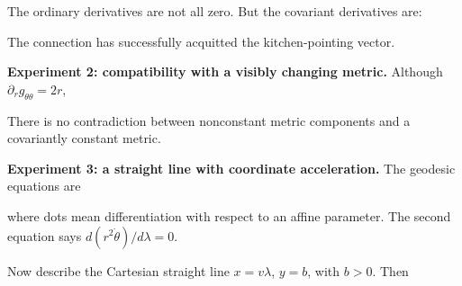 \documentclass[
  11pt,
  letterpaper,
  oneside,
  openany]{scrbook}
\begin{document}
The ordinary derivatives are not all zero. But the covariant derivatives
are:

\begin{center}
\begingroup
{}
\ifdim\wd\grmathbox>\linewidth
\resizebox{\linewidth}{!}{\usebox{\grmathbox}}
\else\usebox{\grmathbox}\fi
\endgroup
\end{center}

The connection has successfully acquitted the kitchen-pointing vector.

\textbf{Experiment 2: compatibility with a visibly changing metric.}
Although \(\partial_rg_{\theta\theta}=2r\),

\begin{center}
\begingroup
{}
\ifdim\wd\grmathbox>\linewidth
\resizebox{\linewidth}{!}{\usebox{\grmathbox}}
\else\usebox{\grmathbox}\fi
\endgroup
\end{center}

There is no contradiction between nonconstant metric components and a
covariantly constant metric.

\textbf{Experiment 3: a straight line with coordinate acceleration.} The
geodesic equations are

\begin{center}
\begingroup
{}
\ifdim\wd\grmathbox>\linewidth
\resizebox{\linewidth}{!}{\usebox{\grmathbox}}
\else\usebox{\grmathbox}\fi
\endgroup
\end{center}

where dots mean differentiation with respect to an affine parameter. The
second equation says \(d(r^2\dot\theta)/d\lambda=0\).

Now describe the Cartesian straight line \(x=v\lambda\), \(y=b\), with
\(b>0\). Then
\end{document}
